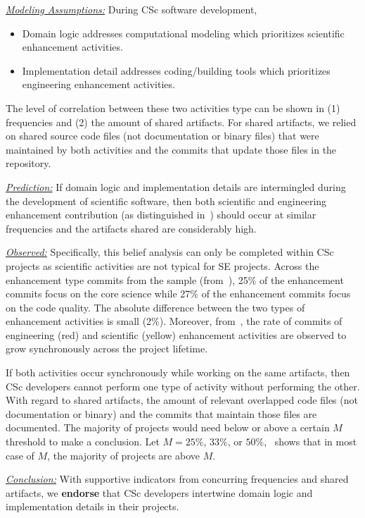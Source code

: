\documentclass[conference,10pt]{IEEEtran}
\newcommand{\bi}{\begin{itemize}}
\newcommand{\ei}{\end{itemize}}
\newenvironment{RQ}{\vspace{1mm}\begin{tcolorbox}[enhanced,width=3.4in,size=fbox,colback=red!5!white,drop shadow southeast,sharp corners]}{\end{tcolorbox}}
\begin{document}
\noindent \textit{\underline{Modeling Assumptions:}} During CSc software development,
\bi
\item Domain logic addresses computational modeling which prioritizes scientific enhancement activities. 
\item Implementation detail addresses coding/building tools which prioritizes engineering enhancement activities. 
\ei

The level of correlation between these two activities type can be shown in (1) frequencies and (2) the amount of shared artifacts. For shared artifacts, we relied on shared source code files (not documentation or binary files) that were maintained by both activities and the commits that update those files in the repository. 

\noindent \textit{\underline{Prediction:}} If domain logic and implementation details are intermingled during the development of scientific software, then both scientific and engineering enhancement contribution (as distinguished in~) should occur at similar frequencies and the artifacts shared are considerably high.

\noindent \textit{\underline{Observed:}} Specifically, this belief analysis can only be completed within CSc projects as scientific activities are not typical for SE projects. Across the enhancement type commits from the sample (from~), 25\% of the enhancement commits focus on the core science while 27\% of the enhancement commits focus on the code quality. The absolute difference between the two types of enhancement activities is small (2\%). Moreover, from~, the rate of commits of engineering (red) and scientific (yellow) enhancement activities are observed to grow synchronously across the project lifetime. 

If both activities occur synchronously while working on the same artifacts, then CSc developers cannot perform one type of activity without performing the other. With regard to shared artifacts, the amount of relevant overlapped code files (not documentation or binary) and the commits that maintain those files are documented. The majority of projects would need below or above a certain $M$ threshold to make a conclusion. Let $M = 25\%$, $33\%$, or $50\%$,~ shows that in most case of $M$, the majority of projects are above $M$.

\begin{RQ}
\textit{\underline{Conclusion:}} With supportive indicators from concurring frequencies and shared artifacts,  
we \textbf{endorse} that CSc developers intertwine domain logic and implementation details in their projects.
\end{RQ}
\end{document}
